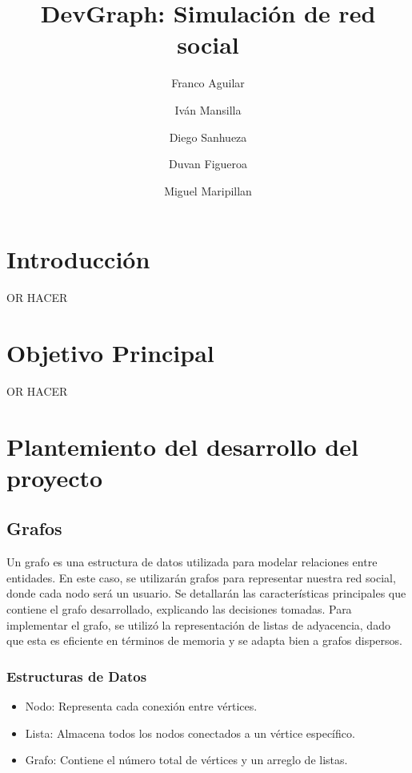 \documentclass[9pt,letterpaper,onecolumn]{rho-class/rho}
\title{DevGraph: Simulación de red social}
\author[$\dagger$]{Franco Aguilar}
\author[$\dagger$]{Iván Mansilla}
\author[$\dagger$]{Diego Sanhueza}
\author[$\dagger$]{Duvan Figueroa}
\author[$\dagger$]{Miguel Maripillan}
\affil[$\dagger$]{Universidad de Magallanes}
\begin{document}
	
    \maketitle
    \thispagestyle{firststyle}
    \tableofcontents


\section{Introducción}

    OR HACER

\section{Objetivo Principal}

    OR HACER

\section{Plantemiento del desarrollo del proyecto}

    \subsection{Grafos}
    Un grafo es una estructura de datos utilizada para modelar relaciones entre entidades.
    En este caso, se utilizarán grafos para representar nuestra red social, donde cada nodo será un usuario.
    Se detallarán las características principales que contiene el grafo desarrollado, explicando las decisiones tomadas. 
    Para implementar el grafo, se utilizó la representación de listas de adyacencia, dado que esta es eficiente en términos de memoria y se adapta bien a grafos dispersos.

    \subsubsection{Estructuras de Datos}
    \begin{itemize}
        \item Nodo: Representa cada conexión entre vértices.
        \item Lista: Almacena todos los nodos conectados a un vértice específico.
        \item Grafo: Contiene el número total de vértices y un arreglo de listas.
    \end{itemize}
\end{document}
